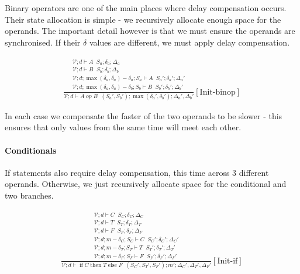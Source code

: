 \documentclass{scrartcl}
\DeclareMathOperator{\ifop}{if}
\DeclareMathOperator{\thenop}{then}
\DeclareMathOperator{\elseop}{else}
\DeclareMathOperator{\initrel}{\overset{init}{\Rightarrow}}
\DeclareMathOperator{\comprel}{\overset{compensate}{\Rightarrow}}
\begin{document}
    Binary operators are one of the main places where delay compensation occurs. Their state allocation is simple - we recursively allocate enough space for the operands. The important detail however is that we must ensure the operands are synchronised. If their $\delta$ values are different, we must apply delay compensation.
    
    \begin{align*}
    \frac{
        \begin{matrix}
        \mathcal{V}; d \vdash A \initrel S_a; \delta_a; \Delta_a \\
        \mathcal{V}; d \vdash B \initrel S_b; \delta_b; \Delta_b \\
        \mathcal{V}; d; \max(\delta_a, \delta_a) - \delta_a; S_a \vdash A \comprel S_a'; \delta_a'; \Delta_a' \\
        \mathcal{V}; d; \max(\delta_a, \delta_a) - \delta_b; S_b \vdash B \comprel S_b'; \delta_b'; \Delta_b'
        \end{matrix}
    }{
        \mathcal{V}; d \vdash A \; op \; B \initrel (S_a', S_b'); \max(\delta_a', \delta_b'); \Delta_a', \Delta_b'
    }[\text{Init-binop}]
    \end{align*}
    
    In each case we compensate the faster of the two operands to be slower - this ensures that only values from the same time will meet each other.
    
    \paragraph{Conditionals}
    
    If statements also require delay compensation, this time across 3 different operands. Otherwise, we just recursively allocate space for the conditional and two branches.
    
    \begin{align*}
    \frac{
        \begin{matrix}
        \mathcal{V}; d \vdash C \initrel S_C; \delta_C; \Delta_C \\
        \mathcal{V}; d \vdash T \initrel S_T; \delta_T; \Delta_T \\
        \mathcal{V}; d \vdash F \initrel S_F; \delta_F; \Delta_F \\
        \mathcal{V}; d; m - \delta_C; S_C \vdash C \comprel S_C'; \delta_C'; \Delta_C' \\
        \mathcal{V}; d; m - \delta_T; S_T \vdash T \comprel S_T'; \delta_T'; \Delta_T' \\
        \mathcal{V}; d; m - \delta_F; S_F \vdash F \comprel S_F'; \delta_F'; \Delta_F'
        \end{matrix}
    }{
        \mathcal{V}; d \vdash \ifop C \thenop T \elseop F \initrel (S_C', S_T', S_F'); m'; \Delta_C', \Delta_T', \Delta_F'
    }[\text{Init-if}]
    \end{align*}
    
\end{document}
